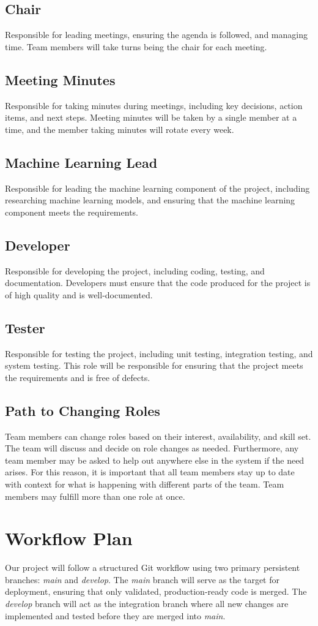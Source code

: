 \documentclass{article}
\begin{document}
\subsection*{Chair} Responsible for leading meetings, ensuring the agenda is
followed, and managing time. Team members will take turns being the chair for
each meeting. \subsection*{Meeting Minutes} Responsible for taking minutes
during meetings, including key decisions, action items, and next steps. Meeting
minutes will be taken by a single member at a time, and the member taking
minutes will rotate every week. \subsection*{Machine Learning Lead} Responsible
for leading the machine learning component of the project, including researching
machine learning models, and ensuring that the machine learning component meets
the requirements. \subsection*{Developer} Responsible for developing the
project, including coding, testing, and documentation. Developers must ensure
that the code produced for the project is of high quality and is
well-documented. \subsection*{Tester} Responsible for testing the project,
including unit testing, integration testing, and system testing. This role will
be responsible for ensuring that the project meets the requirements and is free
of defects. \subsection*{Path to Changing Roles} Team members can change roles
based on their interest, availability, and skill set. The team will discuss and
decide on role changes as needed. Furthermore, any team member may be asked to
help out anywhere else in the system if the need arises. For this reason, it is
important that all team members stay up to date with context for what is
happening with different parts of the team. Team members may fulfill more than
one role at once.

\section{Workflow Plan}
Our project will follow a structured Git workflow using two primary persistent
branches: \textit{main} and \textit{develop}. The \textit{main} branch will
serve as the target for deployment, ensuring that only validated,
production-ready code is merged. The \textit{develop} branch will act as the
integration branch where all new changes are implemented and tested before they
are merged into \textit{main}.
\end{document}
